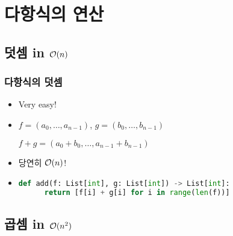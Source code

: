 \section{다항식의 연산}

\subsection{덧셈 in \texorpdfstring{\(\mathcal{O}(n)\)}{O(n)}}

\begin{frame}[fragile]
    \frametitle{다항식의 덧셈}
    \begin{itemize}
        \setlength{\itemsep}{1em}
        \item Very easy!
        \item<2-> \(f = (a_0, \dots, a_{n-1})\), \(g = (b_0, \dots, b_{n-1})\)
              \smallskip
              \begin{center}
                  \(f + g = (a_0 + b_0, \dots, a_{n-1} + b_{n-1})\)
              \end{center}
        \item<2-> 당연히 \(\mathcal{O}(n)\)!
        \item<3->
              \begin{center}
                  \begin{lstlisting}[language=Python]
  def add(f: List[int], g: List[int]) -> List[int]:
      return [f[i] + g[i] for i in range(len(f))]
\end{lstlisting}
              \end{center}
    \end{itemize}
\end{frame}

\subsection{곱셈 in \texorpdfstring{\(\mathcal{O}(n^2)\)}{O(n2)}}

